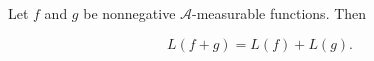 Let $f$ and $g$ be nonnegative $\mathcal{A}$-measurable functions. Then

$$L(f + g) = L(f) + L(g).$$
